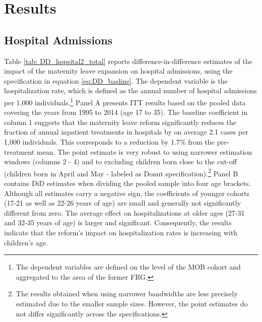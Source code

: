 \documentclass[11pt, a4paper]{article} %
\begin{document}














\section{Results}\label{sec:results}

\subsection{Hospital Admissions}


Table \ref{tab: DD_hopsital2_total} reports difference-in-difference estimates of the impact of the maternity leave expansion on hospital admissions, using the specification in equation \ref{eq:DD_basline}. The dependent variable is the hospitalization rate, which is defined as the annual number of hospital admissions per 1,000 individuals.\footnote{The dependent variables are defined on the level of the MOB cohort and aggregated to the area of the former FRG.} Panel A presents ITT results based on the pooled data covering the years from 1995 to 2014 (age 17 to 35). The baseline coefficient in column 1 suggests that the maternity leave reform significantly reduces the fraction of annual inpatient treatments in hospitals by on average 2.1 cases per 1,000 individuals. This corresponds to a reduction by 1.7\% from the pre-treatment mean. The point estimate is very robust to using narrower estimation windows (columns 2 - 4) and to excluding children born close to the cut-off (children born in April and May - labeled as Donut specification).\footnote{The results obtained when using narrower bandwidths are less precisely estimated due to the smaller sample sizes. However, the point estimates do not differ significantly across the specifications.} Panel B contains DiD estimates when dividing the pooled sample into four age brackets. Although all estimates carry a negative sign, the coefficients of younger cohorts (17-21 as well as 22-26 years of age) are small and generally not significantly different from zero. The average effect on hospitalizations at older ages (27-31 and 32-35 years of age) is larger and significant. Consequently, the results indicate that the reform's impact on hospitalization rates is increasing with children's age.
\end{document}

